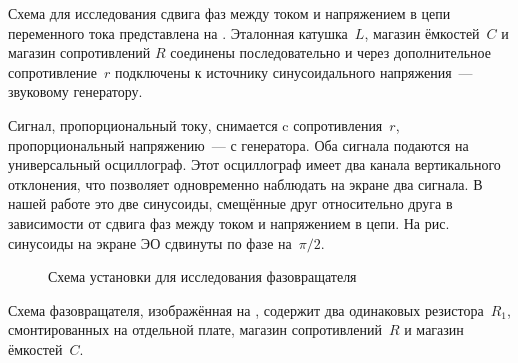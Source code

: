 \experiment  Схема для исследования сдвига фаз между током и напряжением в цепи
переменного тока представлена на . Эталонная
катушка~$L$, магазин ёмкостей~$C$ и магазин сопротивлений $R$ соединены
последовательно и через дополнительное
сопротивление~$r$ подключены к источнику синусоидального напряжения~---
звуковому генератору.

Сигнал, пропорциональный току, снимается c сопротивления~$r$, пропорциональный
напряжению~--- с генератора. Оба сигнала
подаются на универсальный осциллограф. Этот осциллограф имеет два канала
вертикального отклонения, что позволяет
одновременно наблюдать на экране два сигнала. В нашей работе это две синусоиды,
смещённые друг относительно друга в
зависимости от сдвига фаз между током и напряжением в цепи. На
рис.~ синусоиды на экране ЭО сдвинуты по фазе
на~$\pi/2$.


\begin{figure}[h!]
	\caption{Схема установки для исследования фазовращателя}
\end{figure}

Схема фазовращателя, изображённая на , содержит два одинаковых
резистора~$R_1$, смонтированных на отдельной плате,
магазин сопротивлений~$R$ и магазин ёмкостей~$C$.

